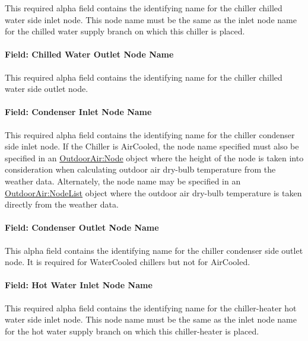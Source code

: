 This required alpha field contains the identifying name for the chiller chilled water side inlet node. This node name must be the same as the inlet node name for the chilled water supply branch on which this chiller is placed.

\paragraph{Field: Chilled Water Outlet Node Name}\label{field-chilled-water-outlet-node-name-8}

This required alpha field contains the identifying name for the chiller chilled water side outlet node.

\paragraph{Field: Condenser Inlet Node Name}\label{field-condenser-inlet-node-name-7}

This required alpha field contains the identifying name for the chiller condenser side inlet node. If the Chiller is AirCooled, the node name specified must also be specified in an \hyperref[outdoorairnode]{OutdoorAir:Node} object where the height of the node is taken into consideration when calculating outdoor air dry-bulb temperature from the weather data. Alternately, the node name may be specified in an \hyperref[outdoorairnodelist]{OutdoorAir:NodeList} object where the outdoor air dry-bulb temperature is taken directly from the weather data.

\paragraph{Field: Condenser Outlet Node Name}\label{field-condenser-outlet-node-name-7}

This alpha field contains the identifying name for the chiller condenser side outlet node. It is required for WaterCooled chillers but not for AirCooled.

\paragraph{Field: Hot Water Inlet Node Name}\label{field-hot-water-inlet-node-name}

This required alpha field contains the identifying name for the chiller-heater hot water side inlet node. This node name must be the same as the inlet node name for the hot water supply branch on which this chiller-heater is placed.

